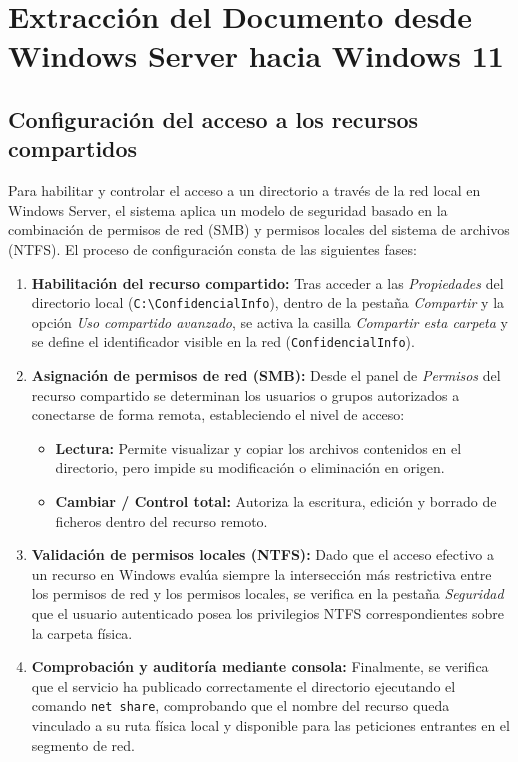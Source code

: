 \section{Extracción del Documento desde Windows Server hacia Windows 11}


\subsection{Configuración del acceso a los recursos compartidos}

Para habilitar y controlar el acceso a un directorio a través de la red local en Windows Server, el sistema aplica un modelo de seguridad basado en la combinación de permisos de red (SMB) y permisos locales del sistema de archivos (NTFS). El proceso de configuración consta de las siguientes fases:

\begin{enumerate}
    \item \textbf{Habilitación del recurso compartido:} Tras acceder a las \textit{Propiedades} del directorio local (\texttt{C:\textbackslash ConfidencialInfo}), dentro de la pestaña \textit{Compartir} y la opción \textit{Uso compartido avanzado}, se activa la casilla \textit{Compartir esta carpeta} y se define el identificador visible en la red (\texttt{ConfidencialInfo}).
    
    \item \textbf{Asignación de permisos de red (SMB):} Desde el panel de \textit{Permisos} del recurso compartido se determinan los usuarios o grupos autorizados a conectarse de forma remota, estableciendo el nivel de acceso:
    \begin{itemize}
        \item \textbf{Lectura:} Permite visualizar y copiar los archivos contenidos en el directorio, pero impide su modificación o eliminación en origen.
        \item \textbf{Cambiar / Control total:} Autoriza la escritura, edición y borrado de ficheros dentro del recurso remoto.
    \end{itemize}
    
    \item \textbf{Validación de permisos locales (NTFS):} Dado que el acceso efectivo a un recurso en Windows evalúa siempre la intersección más restrictiva entre los permisos de red y los permisos locales, se verifica en la pestaña \textit{Seguridad} que el usuario autenticado posea los privilegios NTFS correspondientes sobre la carpeta física.
    
    \item \textbf{Comprobación y auditoría mediante consola:} Finalmente, se verifica que el servicio ha publicado correctamente el directorio ejecutando el comando \texttt{net share}, comprobando que el nombre del recurso queda vinculado a su ruta física local y disponible para las peticiones entrantes en el segmento de red.
\end{enumerate}


